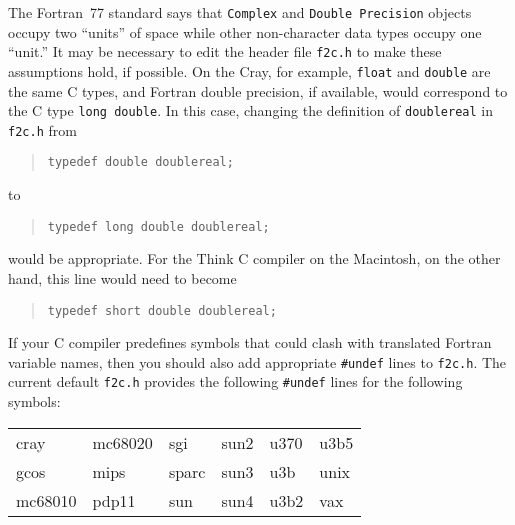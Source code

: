 \documentclass[10pt,a4paper]{article}
\begin{document}
The Fortran~77 standard says that \verb|Complex| and \verb|Double Precision| objects occupy two ``units'' of space while other non-character data types occupy one ``unit.'' It may be necessary to edit the header file \verb|f2c.h| to make these assumptions hold, if possible. On the Cray, for example, \verb|float| and \verb|double| are the same C types, and Fortran double precision, if available, would correspond to the C type \verb|long double|. In this case, changing the definition of \verb|doublereal| in \verb|f2c.h| from
\begin{quote}
\begin{verbatim}
typedef double doublereal;
\end{verbatim}
\end{quote}
to
\begin{quote}
\begin{verbatim}
typedef long double doublereal;
\end{verbatim}
\end{quote}
would be appropriate. For the Think C compiler on the Macintosh, on the other hand, this line would need to become
\begin{quote}
\begin{verbatim}
typedef short double doublereal;
\end{verbatim}
\end{quote}

If your C compiler predefines symbols that could clash with translated Fortran variable names, then you should also add appropriate \verb|#undef| lines to \verb|f2c.h|. The current default \verb|f2c.h| provides the following \verb|#undef| lines for the following symbols:
\begin{center}
\begin{ttfamily}
  \begin{tabular}{llllll}
    cray    & mc68020 & sgi   & sun2 & u370 & u3b5 \\
    gcos    & mips    & sparc & sun3 & u3b  & unix \\
    mc68010 & pdp11   & sun   & sun4 & u3b2 & vax
  \end{tabular}
\end{ttfamily}
\end{center}
\end{document}
